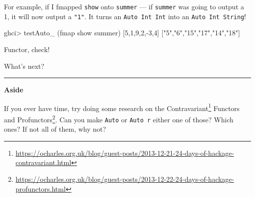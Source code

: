 \documentclass[]{article}
\newenvironment{Shaded}{}{}
\newcommand{\CommentTok}[1]{\textcolor[rgb]{0.38,0.63,0.69}{\textit{#1}}}
\newcommand{\DataTypeTok}[1]{\textcolor[rgb]{0.56,0.13,0.00}{#1}}
\newcommand{\DecValTok}[1]{\textcolor[rgb]{0.25,0.63,0.44}{#1}}
\newcommand{\FunctionTok}[1]{\textcolor[rgb]{0.02,0.16,0.49}{#1}}
\newcommand{\KeywordTok}[1]{\textcolor[rgb]{0.00,0.44,0.13}{\textbf{#1}}}
\newcommand{\NormalTok}[1]{#1}
\newcommand{\OperatorTok}[1]{\textcolor[rgb]{0.40,0.40,0.40}{#1}}
\newcommand{\OtherTok}[1]{\textcolor[rgb]{0.00,0.44,0.13}{#1}}
\newcommand{\StringTok}[1]{\textcolor[rgb]{0.25,0.44,0.63}{#1}}
\renewcommand{\href}[2]{#2\footnote{\url{#1}}}
\begin{document}
For example, if I fmapped \texttt{show} onto \texttt{summer} --- if
\texttt{summer} was going to output a 1, it will now output a \texttt{"1"}. It
turns an \texttt{Auto\ Int\ Int} into an \texttt{Auto\ Int\ String}!

\begin{Shaded}
\end{Shaded}

\begin{Shaded}
\begin{Highlighting}[]
\NormalTok{ghci}\OperatorTok{>}\NormalTok{ testAuto\_ (}\FunctionTok{fmap} \FunctionTok{show}\NormalTok{ summer) [}\DecValTok{5}\NormalTok{,}\DecValTok{1}\NormalTok{,}\DecValTok{9}\NormalTok{,}\DecValTok{2}\NormalTok{,}\OperatorTok{{-}}\DecValTok{3}\NormalTok{,}\DecValTok{4}\NormalTok{]}
\NormalTok{[}\StringTok{"5"}\NormalTok{,}\StringTok{"6"}\NormalTok{,}\StringTok{"15"}\NormalTok{,}\StringTok{"17"}\NormalTok{,}\StringTok{"14"}\NormalTok{,}\StringTok{"18"}\NormalTok{]}
\end{Highlighting}
\end{Shaded}

Functor, check!

What's next?

\begin{center}\rule{0.5\linewidth}{\linethickness}\end{center}

\textbf{Aside}

If you ever have time, try doing some research on the
\href{https://ocharles.org.uk/blog/guest-posts/2013-12-21-24-days-of-hackage-contravariant.html}{Contravariant}
Functors and
\href{https://ocharles.org.uk/blog/guest-posts/2013-12-22-24-days-of-hackage-profunctors.html}{Profunctors}.
Can you make \texttt{Auto} or \texttt{Auto\ r} either one of those? Which ones?
If not all of them, why not?
\end{document}
